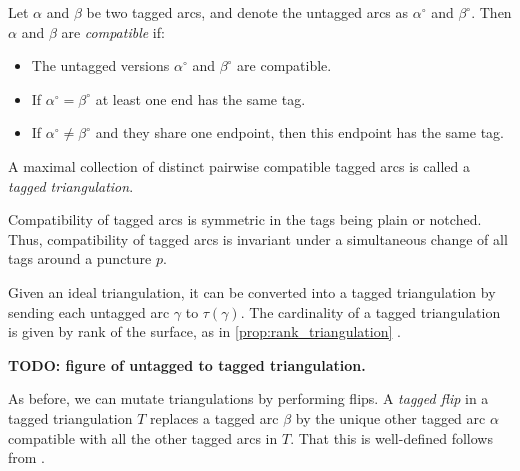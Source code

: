\begin{definition}

	Let $\alpha$ and $\beta$ be two tagged arcs, and denote the untagged arcs as
	$\alpha^\circ$ and $\beta^\circ$. Then $\alpha$ and $\beta$ are
	\emph{compatible} if:
	\begin{itemize}
		\item The untagged versions $\alpha^\circ$ and $\beta^\circ$ are compatible.
		\item If $\alpha^\circ = \beta^\circ$ at least one end has the same tag.
		\item If $\alpha^\circ \neq \beta^\circ$ and they share one endpoint, then this endpoint has
		      the same tag.
	\end{itemize}

	A maximal collection of distinct pairwise compatible tagged arcs is called a
	\emph{tagged triangulation}.
\end{definition}

\begin{remark}\label{rem:change_tags_puncture}

	Compatibility of tagged arcs is symmetric in the tags being plain or notched. Thus,
	compatibility of tagged arcs is invariant under a simultaneous change of all tags
	around a puncture $p$.
\end{remark}

Given an ideal triangulation, it can be converted into a tagged triangulation by
sending each untagged arc $\gamma$ to $\tau(\gamma)$. The cardinality of a tagged
triangulation is given by rank of the surface, as in \cref{prop:rank_triangulation} \parencite[Theorem 7.9]{FominShapiroThurston2008CATriangulatedSurfacesI}.

\textbf{TODO: figure of untagged to tagged triangulation.}

As before, we can mutate triangulations by performing flips. A \emph{tagged
	flip} in a tagged triangulation $T$ replaces a tagged
arc $\beta$ by the unique other tagged arc $\alpha$ compatible with all the other
tagged arcs in $T$. That this is well-defined follows from \cite[Theorem
	7.9]{FominShapiroThurston2008CATriangulatedSurfacesI}.

